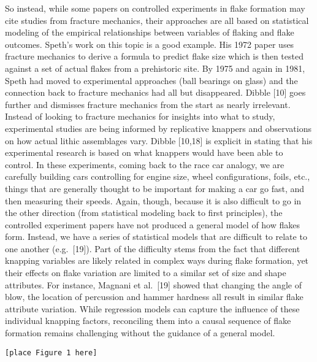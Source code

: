 \documentclass[10pt,letterpaper]{article}
\begin{document}
So instead, while some papers on controlled experiments in flake
formation may cite studies from fracture mechanics, their approaches are
all based on statistical modeling of the empirical relationships between
variables of flaking and flake outcomes. Speth's work on this topic is a
good example. His 1972 paper uses fracture mechanics to derive a formula
to predict flake size which is then tested against a set of actual
flakes from a prehistoric site. By 1975 and again in 1981, Speth had
moved to experimental approaches (ball bearings on glass) and the
connection back to fracture mechanics had all but disappeared. Dibble
{[}10{]} goes further and dismisses fracture mechanics from the start as
nearly irrelevant. Instead of looking to fracture mechanics for insights
into what to study, experimental studies are being informed by
replicative knappers and observations on how actual lithic assemblages
vary. Dibble {[}10,18{]} is explicit in stating that his experimental
research is based on what knappers would have been able to control. In
these experiments, coming back to the race car analogy, we are carefully
building cars controlling for engine size, wheel configurations, foils,
etc., things that are generally thought to be important for making a car
go fast, and then measuring their speeds. Again, though, because it is
also difficult to go in the other direction (from statistical modeling
back to first principles), the controlled experiment papers have not
produced a general model of how flakes form. Instead, we have a series
of statistical models that are difficult to relate to one another
(e.g.~{[}19{]}). Part of the difficulty stems from the fact that
different knapping variables are likely related in complex ways during
flake formation, yet their effects on flake variation are limited to a
similar set of size and shape attributes. For instance, Magnani et
al.~{[}19{]} showed that changing the angle of blow, the location of
percussion and hammer hardness all result in similar flake attribute
variation. While regression models can capture the influence of these
individual knapping factors, reconciling them into a causal sequence of
flake formation remains challenging without the guidance of a general
model.

\begin{verbatim}
[place Figure 1 here]
\end{verbatim}
\end{document}
